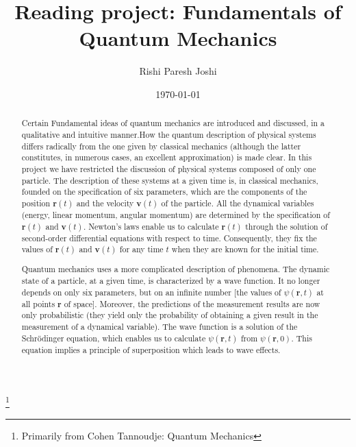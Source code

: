 \documentclass[%
 reprint,
 amsmath,amssymb,
 aps,
]{revtex4-2}
\begin{document}

\title{Reading project: Fundamentals of Quantum Mechanics }%
\thanks{Primarily from Cohen Tannoudje: Quantum Mechanics}%

\author{Rishi Paresh Joshi }
%
 


\date{\today}%

\begin{abstract}
Certain Fundamental ideas of quantum mechanics are introduced and discussed, in a qualitative and intuitive manner.How the quantum description of physical systems differs radically from the one given by classical mechanics (although the latter constitutes, in numerous cases, an excellent approximation) is made clear. In this project we have restricted the discussion of physical systems composed of only one particle. The description of these systems at a given time is, in classical mechanics, founded on the specification of six parameters, which are the components of the position $\mathbf{r}(t)$ and the velocity $\mathbf{v}(t)$ of the particle. All the dynamical variables (energy, linear momentum, angular momentum) are determined by the specification of $\mathbf{r}(t)$ and $\mathbf{v}(t)$. Newton's laws enable us to calculate $\mathbf{r}(t)$ through the solution of second-order differential equations with respect to time. Consequently, they fix the values of $\mathbf{r}(t)$ and $\mathbf{v}(t)$ for any time $t$ when they are known for the initial time.

Quantum mechanics uses a more complicated description of phenomena. The dynamic state of a particle, at a given time, is characterized by a wave function. It no longer depends on only six parameters, but on an infinite number [the values of $\psi(\mathbf{r}, t)$ at all points $\mathbf{r}$ of space]. Moreover, the predictions of the measurement results are now only probabilistic (they yield only the probability of obtaining a given result in the measurement of a dynamical variable). The wave function is a solution of the Schrödinger equation, which enables us to calculate $\psi(\mathbf{r}, t)$ from $\psi(\mathbf{r}, 0)$. This equation implies a principle of superposition which leads to wave effects.


\end{abstract}
\end{document}
